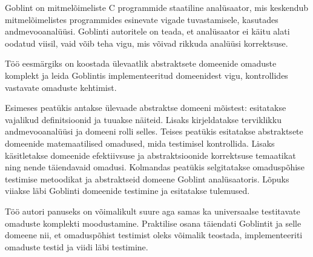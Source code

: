 \documentclass[../thesis.tex]{subfiles}
\begin{document}
Goblint on mitmelõimeliste C programmide staatiline analüsaator, mis keskendub mitmelõimelistes programmides esinevate vigade tuvastamisele, kasutades andmevooanalüüsi. Goblinti autoritele on teada, et analüsaator ei käitu alati oodatud viisil, vaid võib teha vigu, mis võivad rikkuda analüüsi korrektsuse.

\begin{comment}
Omaduspõhine testimine on testimismeetod, mis on sobib hästi programmi loogika matemaatiliste omaduse kontrollimiseks. Selleks kirjeldatakse kontrollitavad omadused predikaatidena ja neile juhuslike argumentide genereerimise metoodika. Nende kombineerimisel genereeritakse soovitud kogus juhuslike argumentide komplekte, millel leitakse predikaatide väärtused, kinnitades omaduse kehtimist või kummutades selle. Lisaks toetab omaduspõhise testimise raamistik leitud vääravate testjuhtude lihtsustamist.

\TODO{Siduda analüsaatori korrektsus omaduspõhise testimise kasutamisega}
\end{comment}

Töö eesmärgiks on koostada ülevaatlik abstraktsete domeenide omaduste komplekt ja leida Goblintis implementeeritud domeenidest vigu, kontrollides vastavate omaduste kehtimist.

Esimeses peatükis antakse ülevaade abstraktse domeeni mõistest: esitatakse vajalikud definitsioonid ja tuuakse näiteid. Lisaks kirjeldatakse terviklikku andmevooanalüüsi ja domeeni rolli selles.
Teises peatükis esitatakse abstraktsete domeenide matemaatilised omadused, mida testimisel kontrollida. Lisaks käsitletakse domeenide efektiivsuse ja abstraktsioonide korrektsuse temaatikat ning nende täiendavaid omadusi.
Kolmandas peatükis selgitatakse omaduspõhise testimise metoodikat ja abstraktseid domeene Goblint analüsaatoris. Lõpuks viiakse läbi Goblinti domeenide testimine ja esitatakse tulemused.

Töö autori panuseks on võimalikult suure aga samas ka universaalse testitavate omaduste komplekti moodustamine. Praktilise osana täiendati Goblintit ja selle domeene nii, et omaduspõhist testimist oleks võimalik teostada, implementeeriti omaduste testid ja viidi läbi testimine.
\end{document}
